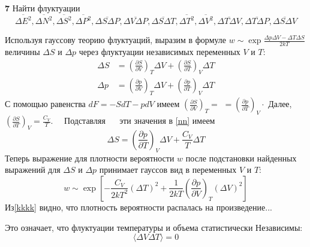 \documentclass[a4paper,12pt]{article} %
\begin{document}
\begin{ttask} \textbf{7}
Найти флуктуации 
\[ \overline{\Delta E^{2}}, \overline{\Delta N^{2}}, \overline{\Delta S^{2}}, \overline{\Delta P^{2}}, 
\overline{\Delta S \Delta P}, \overline{\Delta V \Delta P},\overline{\Delta S \Delta T}, 
\overline{\Delta T^{2}}, \overline{\Delta V^{2}}, \overline{\Delta T \Delta V}, \overline{\Delta T \Delta P}, \overline{\Delta S \Delta V} \]

Используя гауссову теорию флуктуаций, выразим в формуле $ w \sim \exp \frac{\Delta p \Delta V-\Delta T \Delta S}{2 k T} $ 
величины $\Delta S$ и $\Delta p$ через флуктуации независимых переменных $V$ и $T:$
\begin{equation}\label{nn}
\begin{aligned}
\Delta S &=\left(\frac{\partial S}{\partial V}\right)_{T} \Delta V+\left(\frac{\partial S}{\partial T}\right)_{V} \Delta T \\
\Delta p &=\left(\frac{\partial p}{\partial V}\right)_{T} \Delta V+\left(\frac{\partial p}{\partial T}\right)_{V} \Delta T
\end{aligned}
\end{equation}С помощью равенства $d F=-S d T-p d V$ имеем $\left(\frac{\partial S}{\partial V}\right)_{T}=$ $=\left(\frac{\partial p}{\partial T}\right)_{V} \cdot$ Далее, $\left(\frac{\partial S}{\partial T}\right)_{V}=\frac{C_{V}}{T} . \quad$ Подставляя $\quad$ эти значения
в \ref{nn} имеем
$$
\Delta S=\left(\frac{\partial p}{\partial T}\right)_{V} \Delta V+\frac{C_{V}}{T} \Delta T
$$
Теперь выражение для плотности вероятности $ w$ после подстановки найденных выражений для $\Delta S$ и $\Delta p$ принимает гауссов вид в переменных $V$ и $T:$
\begin{equation}\label{kkkk}
w \sim \exp \left[-\frac{C_{V}}{2 k T^{2}}(\Delta T)^{2}+\frac{1}{2 k T}\left(\frac{\partial p}{\partial V}\right)_{T}(\Delta V)^{2}\right]
\end{equation}
Из\ref{kkkk} видно, что плотность вероятности распалась на произведение...

Это означает, что флуктуации температуры и объема статистически Независимы:
$$
\langle\Delta V \Delta T\rangle=0
$$


\end{ttask}
\end{document}
